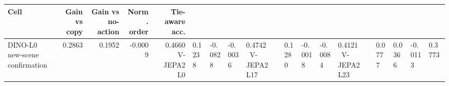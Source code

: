 \begin{tabular}{lrrrr}
\toprule
Cell & Gain vs copy & Gain vs no-action & Norm. order & Tie-aware acc. \\
\midrule
DINO-L0 new-scene confirmation & 0.2863 & 0.1952 & -0.0009 & 0.4660 \
V-JEPA2 L0 & 0.1238 & -0.0828 & -0.0036 & 0.4742 \
V-JEPA2 L17 & 0.1280 & -0.0018 & -0.0084 & 0.4121 \
V-JEPA2 L23 & 0.0777 & 0.0366 & -0.0113 & 0.3773 \
\bottomrule
\end{tabular}
